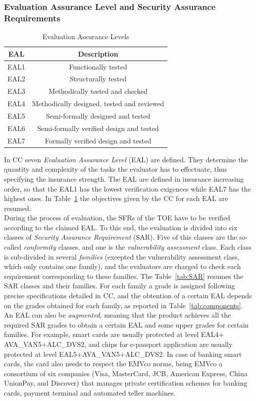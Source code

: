 \subsubsection{Evaluation Assurance Level and Security Assurance Requirements}
\begin{table}[]
\centering
\caption{Evaluation Assurance Levels}
\label{tab:EAL}
\begin{tabular}{cc}
\toprule 
EAL  & Description                                \\
\midrule
EAL1 & Functionally tested                        \\
EAL2 & Structurally tested                        \\
EAL3 & Methodically tested and checked            \\
EAL4 & Methodically designed, tested and reviewed \\
EAL5 & Semi-formally designed and tested          \\
EAL6 & Semi-formally verified design and tested   \\
EAL7 & Formally verified design and tested      \\
\bottomrule
\end{tabular}
\end{table}

In CC seven  \emph{Evaluation Assurance Level} (EAL) are defined. They determine the quantity and complexity of the tasks the evaluator has to effectuate, thus specifying the insurance strength. The EAL are defined in insurance increasing order, so that the EAL1 has the lowest verification exigences while EAL7 has the highest ones. In Table~\ref{tab:EAL} the objectives given by the CC for each EAL are resumed.\\

During the process of evaluation, the SFRs of the TOE have to be verified according to the claimed EAL. To this end, the evaluation is  divided into six classes of \emph{Security Assurance Requirement} (SAR). Five of this classes are the so-called \emph{conformity} classes, and one is the \emph{vulnerability assessment} class. Each class is sub-divided in several \emph{families} (excepted the vulnerability assessment class, which only contains one family), and the evaluators are charged to check each requirement corresponding to these families. The Table~\ref{tab:SAR} resumes the SAR classes and their families. For each family a grade is assigned following precise specifications detailed in CC, and the obtention of a certain EAL depends on the grades obtained for each family, as reported in Table~\ref{tab:components}. An EAL can also be \emph{augmented}, meaning that the product achieves all the required SAR grades to obtain a certain EAL and some upper grades for certain families. For example, smart cards are usually protected at level EAL4$+$AVA\_VAN5$+$ALC\_DVS2, and chips for e-passport application are usually protected at level EAL5$+$AVA\_VAN5$+$ALC\_DVS2. In case of banking smart cards, the card also needs to respect the EMVco norms, being EMVco a consortium of six companies (Visa, MasterCard, JCB, American Express, China UnionPay, and Discover) that manages private certification schemes for banking cards, payment terminal and automated teller machines. 


